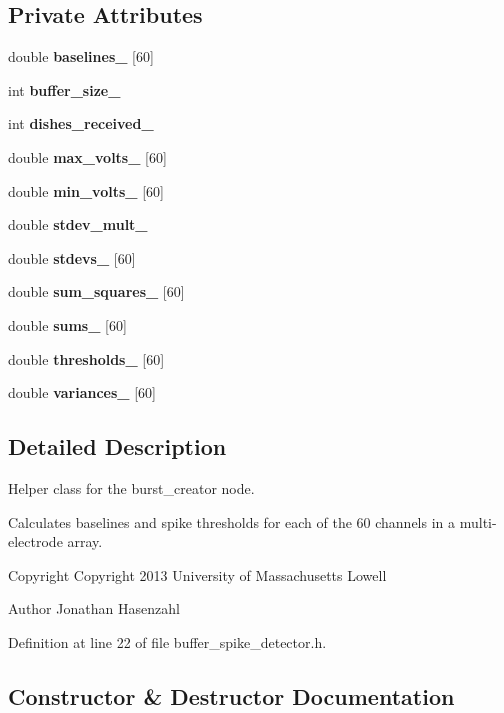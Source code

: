 \subsection*{\-Private \-Attributes}
\begin{DoxyCompactItemize}
\item 
double {\bf baselines\-\_\-} [60]
\item 
int {\bf buffer\-\_\-size\-\_\-}
\item 
int {\bf dishes\-\_\-received\-\_\-}
\item 
double {\bf max\-\_\-volts\-\_\-} [60]
\item 
double {\bf min\-\_\-volts\-\_\-} [60]
\item 
double {\bf stdev\-\_\-mult\-\_\-}
\item 
double {\bf stdevs\-\_\-} [60]
\item 
double {\bf sum\-\_\-squares\-\_\-} [60]
\item 
double {\bf sums\-\_\-} [60]
\item 
double {\bf thresholds\-\_\-} [60]
\item 
double {\bf variances\-\_\-} [60]
\end{DoxyCompactItemize}


\subsection{\-Detailed \-Description}
\-Helper class for the burst\-\_\-creator node. 

\-Calculates baselines and spike thresholds for each of the 60 channels in a multi-\/electrode array.

\begin{DoxyCopyright}{\-Copyright}
\-Copyright 2013 \-University of \-Massachusetts \-Lowell 
\end{DoxyCopyright}
\begin{DoxyAuthor}{\-Author}
\-Jonathan \-Hasenzahl 
\end{DoxyAuthor}


\-Definition at line 22 of file buffer\-\_\-spike\-\_\-detector.\-h.



\subsection{\-Constructor \& \-Destructor \-Documentation}
